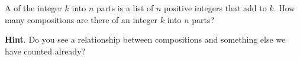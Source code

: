 \documentclass{book}
\begin{document}
\setcounter{cpjt}{128}
\addtocounter{cpjt}{-1}
\begin{activity}\label{compositionagian}
\hypertarget{p-862}{}%
A  of the integer \(k\) into \(n\) parts is a list of \(n\) positive integers that add to \(k\).  How many compositions are there of an integer \(k\) into \(n\) parts?%
\par\smallskip%
\noindent\textbf{Hint}.\hypertarget{hint-86}{}\quad%
\hypertarget{p-863}{}%
Do you see a relationship between compositions and something else we have counted already?%
\par\smallskip%
\noindent\end{activity}

\clearpage
\end{document}
